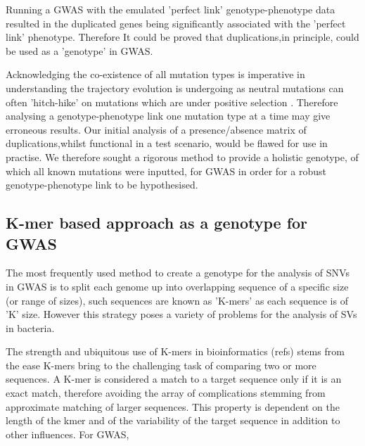 \documentclass{article}
\begin{document}
Running a GWAS with the emulated 'perfect link' genotype-phenotype data resulted in the duplicated genes being significantly associated with the 'perfect link' phenotype. Therefore It could be proved that duplications,in principle, could be used as a 'genotype' in GWAS.


Acknowledging the co-existence of all mutation types is imperative in understanding the trajectory evolution is undergoing as neutral mutations can often 'hitch-hike' on mutations which are under positive selection . Therefore analysing a genotype-phenotype link one mutation type at a time may give erroneous results. Our initial analysis of a presence/absence matrix of duplications,whilst functional in a test scenario, would be flawed for use in practise. We therefore sought a rigorous method to provide a holistic genotype, of which all known mutations were inputted, for GWAS in order for a robust genotype-phenotype link to be hypothesised.

\subsection{K-mer based approach as a genotype for GWAS}

The most frequently used method to create a genotype for the analysis of SNVs in GWAS is to split each genome up into overlapping sequence of a specific size (or range of sizes), such sequences are known as 'K-mers' as each sequence is of 'K' size. However this strategy poses a variety of problems for the analysis of SVs in bacteria. 


The strength and ubiquitous use of K-mers in bioinformatics (refs) stems from the ease K-mers bring to the challenging task of comparing two or more sequences. A K-mer is considered a match to a target sequence only if it is an exact match, therefore avoiding the array of complications stemming from approximate matching of larger sequences. This property is dependent on the length of the kmer and of the variability of the target sequence in addition to other influences. For GWAS,
\end{document}
